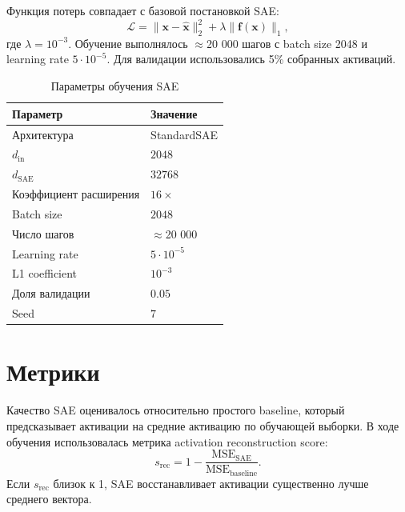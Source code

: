\documentclass[a4paper,14pt]{extreport}
\begin{document}
Функция потерь совпадает с базовой постановкой SAE:
\begin{equation}
    \mathcal{L}
    =
    \|\mathbf{x} - \hat{\mathbf{x}}\|_2^2
    +
    \lambda \|\mathbf{f}(\mathbf{x})\|_1,
\end{equation}
где $\lambda = 10^{-3}$. Обучение выполнялось ${\approx}$20 000 шагов с batch size 2048
и learning rate $5 \cdot 10^{-5}$. Для валидации использовались 5\% собранных
активаций.

\begin{table}[H]
    \centering
    \small
    \caption{Параметры обучения SAE}
    \label{tab:sae_training_params}
    \begin{tabular}{p{}p{}}
        \toprule
        Параметр & Значение \\
        \midrule
        Архитектура & StandardSAE \\
        $d_{\mathrm{in}}$ & $2048$ \\
        $d_{\mathrm{SAE}}$ & $32768$ \\
        Коэффициент расширения & $16\times$ \\
        Batch size & $2048$ \\
        Число шагов & ${\approx}$20 000 \\
        Learning rate & $5 \cdot 10^{-5}$ \\
        L1 coefficient & $10^{-3}$ \\
        Доля валидации & $0.05$ \\
        Seed & $7$ \\
        \bottomrule
    \end{tabular}
\end{table}

\section{Метрики}

Качество SAE оценивалось относительно простого baseline, который предсказывает активации 
на средние активацию по обучающей выборки. В ходе обучения использовалась метрика
activation reconstruction score:
\begin{equation}
    s_{\mathrm{rec}}
    =
    1 - \frac{\mathrm{MSE}_{\mathrm{SAE}}}{\mathrm{MSE}_{\mathrm{baseline}}}.
\end{equation}
Если $s_{\mathrm{rec}}$ близок к 1, SAE восстанавливает активации существенно
лучше среднего вектора.
\end{document}
